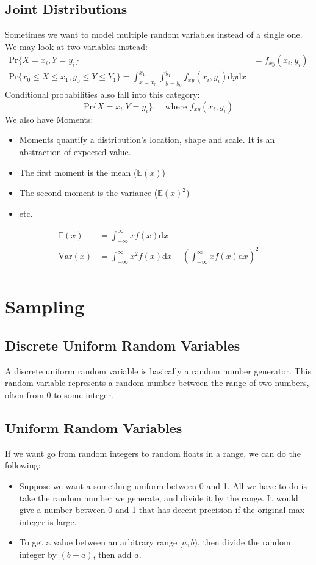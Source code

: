\documentclass[10pt]{article}
\newcommand{\dd}{\text{d}}
\newcommand{\pr}{\text{Pr}}
\begin{document}
\subsection*{Joint Distributions}
Sometimes we want to model multiple random variables instead of a single one.  We may look at two variables instead:
\begin{align*}
\pr\{X = x_i, Y = y_i\} &= f_{xy}(x_i, y_i) \\
\pr\{x_0 \leq X \leq x_1, y_0 \leq Y \leq Y_1\} = \int_{x = x_0}^{x_1} \int_{y = y_0}^{y_1} f_{xy}(x_i, y_i) \dd y \dd x
\end{align*}
Conditional probabilities also fall into this category:
\[\pr \{X = x_i | Y = y_i\}, \quad \text{where } f_{xy}(x_i, y_i)\]
We also have Moments:
\begin{itemize}
	\item Moments quantify a distribution's location, shape and scale.  It is an abstraction of expected value.
	\item The first moment is the mean ($\mathbb{E}(x)$)
	\item The second moment is the variance ($\mathbb{E}(x)^2$)
	\item etc.
\end{itemize}
\begin{align*}
    \mathbb{E}(x) &= \int_{-\infty}^\infty x f(x) \dd x \\
    \text{Var}(x) &= \int_{-\infty}^\infty x^2 f(x) \dd x - \left(\int_{-\infty}^\infty x f(x) \dd x\right)^2 \\
\end{align*}

\section*{Sampling}
\subsection*{Discrete Uniform Random Variables}
A discrete uniform random variable is basically a random number generator.  This random variable represents a random number between the range of two numbers, often from 0 to some integer.
\subsection*{Uniform Random Variables}
If we want go from random integers to random floats in a range, we can do the following:
\begin{itemize}
	\item Suppose we want a something uniform between 0 and 1.  All we have to do is take the random number we generate, and divide it by the range.  It would give a number between 0 and 1 that has decent precision if the original max integer is large.
	\item To get a value between an arbitrary range $[a, b)$, then divide the random integer by $(b - a)$, then add $a$.
\end{itemize}
\end{document}

